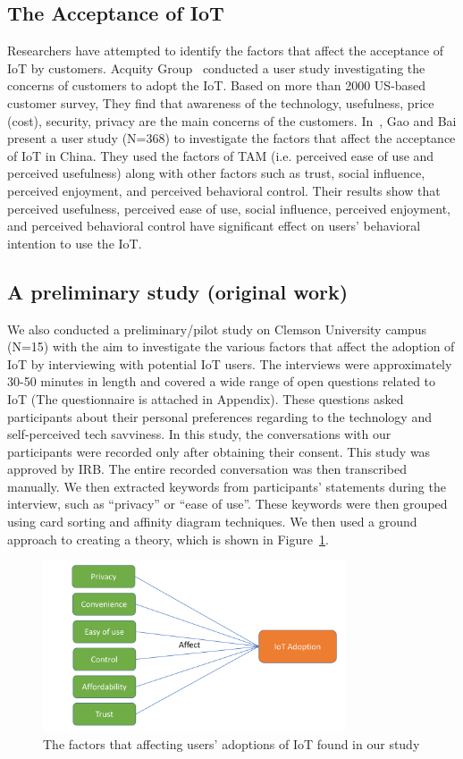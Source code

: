 \subsection{The Acceptance of IoT}
Researchers have attempted to identify the factors that affect the acceptance of IoT by customers. Acquity Group~\cite{acquity2014internet} conducted a user study investigating the concerns of customers to adopt the IoT. Based on more than 2000 US-based customer survey, They find that awareness of the technology, usefulness, price (cost), security, privacy are the main concerns of the customers. In~\cite{gao2014unified}, Gao and Bai present a user study (N=368) to investigate the factors that affect the acceptance of IoT in China. They used the factors of TAM (i.e. perceived ease of use and perceived usefulness) along with other factors such as trust, social influence, perceived enjoyment, and perceived behavioral control. Their results show that perceived usefulness, perceived ease of use, social influence, perceived enjoyment, and perceived behavioral control have significant effect on users' behavioral intention to use the IoT. 

\subsection{A preliminary study (original work)}
We also conducted a preliminary/pilot study on Clemson University campus (N=15) with the aim to investigate the various factors that affect the adoption of IoT by interviewing with potential IoT users. The interviews were approximately 30-50 minutes in length and covered a wide range of open questions related to IoT (The questionnaire is attached in Appendix). These questions asked participants about their personal preferences regarding to the technology and self-perceived tech savviness. In this study, the conversations with our participants were recorded only after obtaining their consent. This study was approved by IRB. The entire recorded conversation was then transcribed manually. We then extracted keywords from participants' statements during the interview, such as ``privacy'' or ``ease of use''. These keywords were then grouped using card sorting and affinity diagram techniques. We then used a ground approach to creating a theory, which is shown in Figure~\ref{fig:pilotstudymodel}.

\begin{figure}
	\centering
	\includegraphics[width=0.8\textwidth]{figures/pilot_study_model.pdf}
	\caption{The factors that affecting users' adoptions of IoT found in our study}
	\label{fig:pilotstudymodel}
\end{figure}

